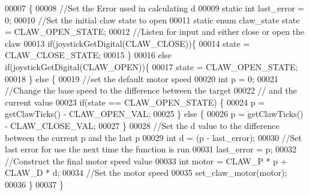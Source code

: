\begin{DoxyCode}
00007                    \{
00008   \textcolor{comment}{//Set the Error used in calculating d}
00009   \textcolor{keyword}{static} \textcolor{keywordtype}{int} last\_error = 0;
00010   \textcolor{comment}{//Set the initial claw state to open}
00011   \textcolor{keyword}{static} \textcolor{keyword}{enum} claw_state state = CLAW_OPEN_STATE;
00012   \textcolor{comment}{//Listen for input and either close or open the claw}
00013   \textcolor{keywordflow}{if}(joystickGetDigital(CLAW_CLOSE))\{
00014     state = CLAW_CLOSE_STATE;
00015   \}
00016   \textcolor{keywordflow}{else} \textcolor{keywordflow}{if}(joystickGetDigital(CLAW_OPEN))\{
00017     state = CLAW_OPEN_STATE;
00018   \} \textcolor{keywordflow}{else} \{
00019     \textcolor{comment}{//set the default motor speed}
00020     \textcolor{keywordtype}{int} p = 0;
00021     \textcolor{comment}{//Change the base speed to the difference between the target}
00022     \textcolor{comment}{// and the current value}
00023     \textcolor{keywordflow}{if}(state == CLAW_OPEN_STATE) \{
00024       p = getClawTicks() - CLAW_OPEN_VAL;
00025     \} \textcolor{keywordflow}{else} \{
00026       p = getClawTicks() - CLAW_CLOSE_VAL;
00027     \}
00028     \textcolor{comment}{//Set the d value to the difference between the current p and the last p}
00029     \textcolor{keywordtype}{int} d = (p - last\_error);
00030     \textcolor{comment}{//Set last error for use the next time the function is run}
00031     last\_error = p;
00032     \textcolor{comment}{//Construct the final motor speed value}
00033     \textcolor{keywordtype}{int} motor = CLAW_P * p + CLAW_D * d;
00034     \textcolor{comment}{//Set the motor speed}
00035     set_claw_motor(motor);
00036   \}
00037 \}
\end{DoxyCode}

